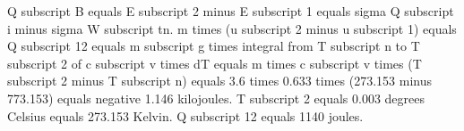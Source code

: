 Q subscript B equals E subscript 2 minus E subscript 1 equals sigma Q subscript i minus sigma W subscript tn.  
m times (u subscript 2 minus u subscript 1) equals Q subscript 12 equals m subscript g times integral from T subscript n to T subscript 2 of c subscript v times dT equals m times c subscript v times (T subscript 2 minus T subscript n) equals 3.6 times 0.633 times (273.153 minus 773.153) equals negative 1.146 kilojoules.  
T subscript 2 equals 0.003 degrees Celsius equals 273.153 Kelvin.  
Q subscript 12 equals 1140 joules.